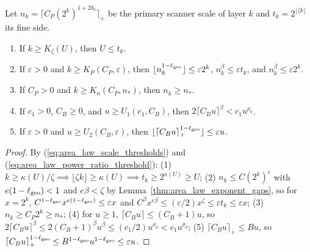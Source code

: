 \begin{lemma}
    \label{thm:area_law_two_family_scale_thresholds}
    \leanok
    Let $n_k=\lceil C_P(2^k)^{1+2\delta_0}\rceil_+$ be the primary scanner scale
    of layer $k$ and $t_k=2^{\lfloor\zeta k\rfloor}$ its fine side.
    \begin{enumerate}
        \item If $k\ge K_\zeta(U)$, then $U\le t_k$.
        \item If $\varepsilon>0$ and $k\ge K_P(C_P,\varepsilon)$, then
              $\lfloor n_k^{1-\ell_{\rm geo}}\rfloor\le\varepsilon2^k$,
              $n_k^\beta\le\varepsilon t_k$, and $n_k^\beta\le\varepsilon2^k$.
        \item If $C_P>0$ and $k\ge K_n(C_P,n_*)$, then $n_k\ge n_*$.
        \item If $c_1>0$, $C_B\ge0$, and $u\ge U_1(c_1,C_B)$, then
              $2\lceil C_Bu\rceil^\beta<c_1u^{\rho_0}$.
        \item If $\varepsilon>0$ and $u\ge U_2(C_B,\varepsilon)$, then
              $\lfloor\lceil C_Bu\rceil_+^{1-\ell_{\rm geo}}\rfloor\le\varepsilon u$.
    \end{enumerate}
\end{lemma}

\begin{proof}
    \leanok
    By (\ref{eq:area_law_scale_thresholds}) and (\ref{eq:area_law_power_ratio_threshold}):
    (1) $k\ge\kappa(U)/\zeta\implies\lfloor\zeta k\rfloor\ge\kappa(U)\implies t_k\ge2^{\kappa(U)}\ge U$;
    (2) $n_k\le C(2^k)^e$ with $e(1-\ell_{\rm geo})<1$ and $e\beta<\zeta$ by
    Lemma~\ref{thm:area_law_exponent_gaps}, so for $x=2^k$,
    $C^{1-\ell_{\rm geo}}x^{e(1-\ell_{\rm geo})}\le\varepsilon x$ and
    $C^\beta x^{e\beta}\le(\varepsilon/2)x^\zeta\le\varepsilon t_k\le\varepsilon x$;
    (3) $n_k\ge C_P2^k\ge n_*$;
    (4) for $u\ge 1$, $\lceil C_Bu\rceil\le(C_B+1)u$, so
    $2\lceil C_Bu\rceil^\beta\le2(C_B+1)^\beta u^\beta\le(c_1/2)u^{\rho_0}<c_1u^{\rho_0}$;
    (5) $\lceil C_Bu\rceil_+\le Bu$, so
    $\lceil C_Bu\rceil_+^{1-\ell_{\rm geo}}\le B^{1-\ell_{\rm geo}}u^{1-\ell_{\rm geo}}\le\varepsilon u$.
\end{proof}

